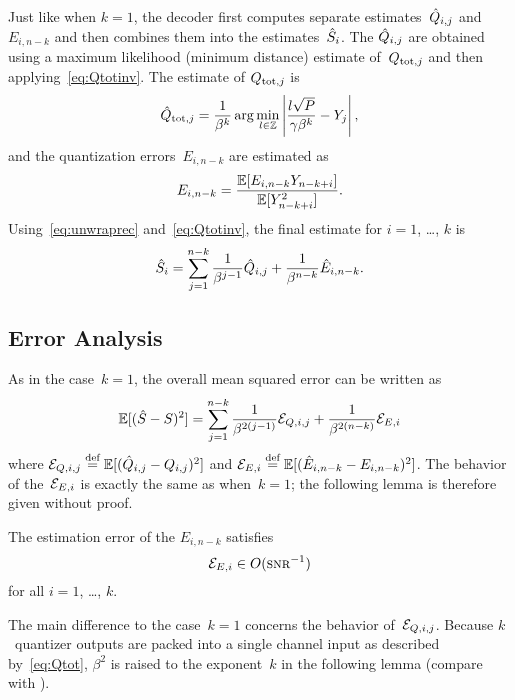 Just like when $k=1$, the decoder first computes separate estimates~$\hat{Q}_{i,j}$
and~$E_{i,n-k}$ and then combines them into the estimates~${\hat{S}}_i$. The
$\hat{Q}_{i,j}$ are obtained using a maximum likelihood (minimum distance) estimate
of~$Q_{\operatorname{tot},j}$ and then applying~\eqref{eq:Qtotinv}. The estimate of
$Q_{\operatorname{tot},j}$ is
\begin{equation*}
  \hat{Q}_{\operatorname{tot},j} = \frac{1}{\beta^k} \arg\min_{l\in\mathbb{Z}}
  \left| \frac{l\sqrt P}{\gamma \beta^k} - Y_j \right|,
\end{equation*}
and the quantization errors~$E_{i,n-k}$ are estimated as
\begin{equation*}
  E_{i,n-k} = \frac{\mathbb{E}[E_{i,n-k} Y_{n-k+i}]}{\mathbb{E}[Y_{n-k+i}^2]}.
\end{equation*}
Using~\eqref{eq:unwraprec} and~\eqref{eq:Qtotinv}, the final estimate for $i =
1$, \dots, $k$ is
\begin{equation*}
  {\hat{S}}_i = \sum_{j=1}^{n-k} \frac{1}{\beta^{j-1}} \hat{Q}_{i,j} +
  \frac{1}{\beta^{n-k}} \hat{E}_{i,n-k}.
\end{equation*}


\subsection{Error Analysis}

As in the case~$k=1$, the overall mean squared error can be written as
\begin{equation*}
  {\mathbb{E}[({\hat{S}}- S)^2]} = \sum_{j=1}^{n-k} \frac{1}{\beta^{2(j-1)}} {\mathcal{E}}_{Q,i,j} + 
  \frac{1}{\beta^{2(n-k)}} {\mathcal{E}}_{E,i}
\end{equation*}
where ${\mathcal{E}}_{Q,i,j} \stackrel{\text{def}}{=} \mathbb{E}[(\hat{Q}_{i,j} - Q_{i,j})^2]$ and ${\mathcal{E}}_{E,i} \stackrel{\text{def}}{=}
\mathbb{E}[(\hat{E}_{i,n-k} - E_{i,n-k})^2]$. The behavior of the~${\mathcal{E}}_{E,i}$ is exactly
the same as when~$k=1$; the following lemma is therefore given without proof.

\begin{lemma}
  \label{lem:Eedecayk}
  The estimation error of the $E_{i,n-k}$ satisfies
  \begin{equation*}
    \Err_{E,i} \in O(\snr^{-1})
  \end{equation*}
  for all $i = 1$, \dots, $k$. 
\end{lemma}

The main difference to the case~$k=1$ concerns the behavior of~${\mathcal{E}}_{Q,i,j}$.
Because $k$~quantizer outputs are packed into a single channel input as
described by~\eqref{eq:Qtot}, $\beta^2$ is raised to the exponent~$k$ in the
following lemma (compare with ).

